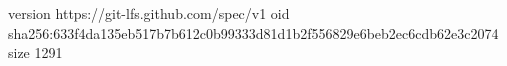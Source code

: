 version https://git-lfs.github.com/spec/v1
oid sha256:633f4da135eb517b7b612c0b99333d81d1b2f556829e6beb2ec6cdb62e3c2074
size 1291
